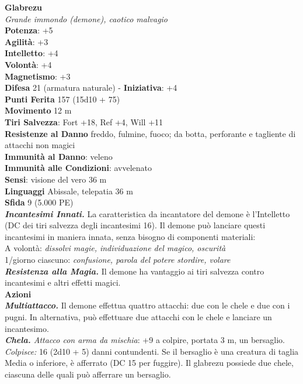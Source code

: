 \begin{multicols}{2}
\medskip\textbf{Glabrezu}\\
\emph{Grande immondo (demone), caotico malvagio}\\
\textbf{Potenza}: +5\\
\textbf{Agilità}: +3\\
\textbf{Intelletto}: +4\\
\textbf{Volontà}: +4\\
\textbf{Magnetismo}: +3\\
\textbf{Difesa} 21 (armatura naturale) - \textbf{Iniziativa}: +4\\
\textbf{Punti Ferita} 157 (15d10 + 75)\\
\textbf{Movimento} 12 m\\
\textbf{Tiri Salvezza}: Fort +18, Ref +4, Will +11\\
\textbf{Resistenze al Danno} freddo, fulmine, fuoco; da botta, perforante e tagliente di attacchi non magici\\
\textbf{Immunità al Danno}: veleno\\
\textbf{Immunità alle Condizioni}: avvelenato\\
\textbf{Sensi}: visione del vero 36 m\\
\textbf{Linguaggi} Abissale, telepatia 36 m \\
\textbf{Sfida} 9 (5.000 PE)\smallskip\\
\emph{\textbf{Incantesimi Innati.}} La caratteristica da incantatore del demone è l'Intelletto (DC dei tiri salvezza degli incantesimi 16). Il demone può lanciare questi incantesimi in maniera innata, senza bisogno di componenti materiali:\\
A volontà: \emph{dissolvi magie, individuazione del magico, oscurità}\\
1/giorno ciascuno: \emph{confusione, parola del potere stordire, volare}\\
\emph{\textbf{Resistenza alla Magia.}} Il demone ha vantaggio ai tiri salvezza contro  incantesimi e altri effetti magici. \\
\smallskip\textbf{Azioni}\\
\emph{\textbf{Multiattacco.}} Il demone effettua quattro attacchi: due con le chele e due con i pugni. In alternativa, può effettuare due attacchi con le chele e lanciare un incantesimo.\\
\emph{\textbf{Chela.} Attacco con arma da mischia}: +9 a colpire, portata 3 m, un bersaglio.\\
\emph{Colpisce:} 16 (2d10 + 5) danni contundenti. Se il bersaglio è una creatura di taglia Media o inferiore, è afferrato (DC 15 per fuggire). Il glabrezu possiede due chele, ciascuna delle quali può afferrare un bersaglio.\\

\end{multicols}
